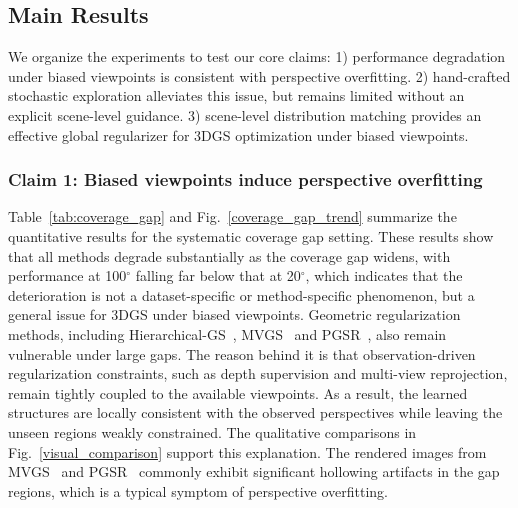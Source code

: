 \documentclass[lettersize,journal]{IEEEtran}
\begin{document}
\subsection{Main Results}


We organize the experiments to test our core claims: 
1) performance degradation under biased viewpoints is consistent with perspective overfitting.
2) hand-crafted stochastic exploration alleviates this issue, but remains limited without an explicit scene-level guidance.
3) scene-level distribution matching provides an effective global regularizer for 3DGS optimization under biased viewpoints.


\subsubsection{Claim 1: Biased viewpoints induce perspective overfitting}


Table~\ref{tab:coverage_gap} and Fig.~\ref{coverage_gap_trend} summarize the quantitative results for the systematic coverage gap setting. 
These results show that all methods degrade substantially as the coverage gap widens, with performance at 100$^\circ$ falling far below that at 20$^\circ$,
which indicates that the deterioration is not a dataset-specific or method-specific phenomenon, but a general issue for 3DGS under biased viewpoints.
Geometric regularization methods, including Hierarchical-GS~\cite{hierarchical}, MVGS~\cite{mvgs} and PGSR~\cite{pgsr}, also remain vulnerable under large gaps.
The reason behind it is that observation-driven regularization constraints, such as depth supervision and multi-view reprojection, remain tightly coupled to the available viewpoints. As a result, the learned structures are locally consistent with the observed perspectives while leaving the unseen regions weakly constrained. 
The qualitative comparisons in Fig.~\ref{visual_comparison} support this explanation. The rendered images from MVGS~\cite{mvgs} and PGSR~\cite{pgsr} commonly exhibit significant hollowing artifacts in the gap regions, which is a typical symptom of perspective overfitting.
\end{document}
